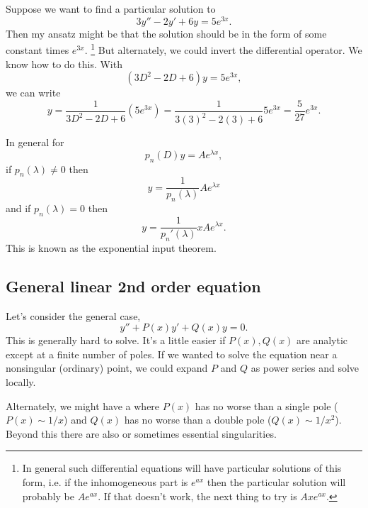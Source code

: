 \begin{exm}
Suppose we want to find a particular solution to
\begin{equation}
    3y''-2y' + 6y = 5e^{3x}.
\end{equation}
Then my ansatz might be that the solution should be in the form of some constant times $e^{3x}$.%
    \footnote{In general such differential equations will have particular solutions of this form, i.e. if the inhomogeneous part is $e^{ax}$ then the particular solution will probably be $Ae^{ax}$. If that doesn't work, the next thing to try is $Axe^{ax}$.}
But alternately, we could invert the differential operator. We know how to do this. With
\begin{equation}
    (3D^2 -2D +6) y =5e^{3x},
\end{equation}
we can write
\begin{equation}
    y=\frac{1}{3D^2-2D + 6} (5e^{3x}) = \frac{1}{3(3)^2 - 2(3) + 6} 5e^{3x} =\frac{5}{27}e^{3x}.
\end{equation}
\end{exm}
In general for
\begin{equation}
    p_n(D) y = Ae^{\lambda x},
\end{equation}
if $p_n(\lambda) \neq 0$ then 
\begin{equation}
    y=\frac{1}{p_n(\lambda)} Ae^{\lambda x}    
\end{equation}
and if $p_n(\lambda)=0$ then 
\begin{equation}
    y=\frac{1}{p_n'(\lambda)}x Ae^{\lambda x}.
\end{equation}
This is known as the exponential input theorem.

\subsection*{General linear 2nd order equation}
Let's consider the general case,
\begin{equation}
    y'' + P(x) y' + Q(x) y=0.
\end{equation}
This is generally hard to solve. It's a little easier if $P(x),Q(x)$ are analytic except at a finite number of poles. If we wanted to solve the equation near a nonsingular (ordinary) point, we could expand $P$ and $Q$ as power series and solve locally.

Alternately, we might have a  where $P(x)$ has no worse than a single pole ($P(x)\sim 1/x$) and $Q(x)$ has no worse than a double pole ($Q(x)\sim 1/x^2$). Beyond this there are also  or sometimes essential singularities.

